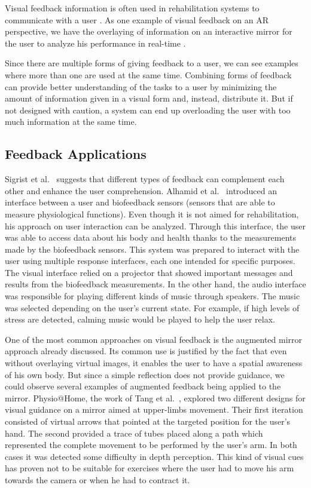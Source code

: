 Visual feedback information is often used in rehabilitation systems to communicate with a user \cite{Design2005}. 
As one example of visual feedback on an \ac{AR} perspective, we have the overlaying of 
information on an interactive mirror for the user to analyze his performance in real-time \cite{Anderson,Tang2014a,Velloso2013,Klein2013,Alhamid2012a,blum2012}. 

Since there are multiple forms of giving feedback to a user, we can see examples where more than one are used at the same time.
Combining forms of feedback can provide better understanding of the tasks to a user by minimizing the amount of 
information given in a visual form and, instead, distribute it. 
But if not designed with caution, a system can end up overloading the user with too much information at the same time. 

\subsection{Feedback Applications}



Sigrist et al.~\cite{Sigrist2013} suggests that different types of feedback can complement each other and enhance the user comprehension. 
Alhamid et al.~\cite{Alhamid2012a} introduced an interface between a user and biofeedback sensors (sensors that are able to measure physiological functions). 
Even though it is not aimed for rehabilitation, his approach on user interaction can be analyzed.
Through this interface, the user was able to access data about his body and health thanks to the measurements made by the biofeedback sensors.
This system was prepared to interact with the user using multiple response interfaces, each one intended for specific purposes.
The visual interface relied on a projector that showed important messages and results from the biofeedback measurements.
In the other hand, the audio interface was responsible for playing different kinds of music through speakers. 
The music was selected depending on the user's current state. For example, if high levels of stress are detected,  calming music would be played to help the user relax.

One of the most common approaches on visual feedback is the augmented mirror approach already discussed. 
Its common use is justified by the fact that even without overlaying virtual images, it enables the user to have a spatial awareness of his own body.
But since a simple reflection does not provide guidance, we could observe several examples of augmented feedback being applied to the mirror.
Physio@Home, the work of Tang et al.~\cite{Tang2014a}, explored two different designs for visual guidance on a mirror aimed at upper-limbs movement.
Their first iteration consisted of virtual arrows that pointed at the targeted position for the user's hand.
The second provided a trace of tubes placed along a path which represented the complete movement to be performed by the user's arm.
In both cases it was detected some difficulty in depth perception. 
This kind of visual cues has proven not to be suitable for exercises 
where the user had to move his arm towards the camera or when he had to contract it.

